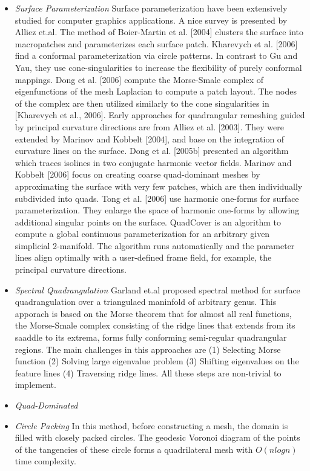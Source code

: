 \documentclass[11pt, a4paper]{paper}
\begin{document}
\begin{itemize}
\item {\em Surface Parameterization } Surface parameterization have been
extensively studied for computer graphics applications. A nice survey is
presented by Alliez et.al. \cite{alliez}
The method of Boier-Martin et al. [2004] clusters the surface into macropatches 
and parameterizes each surface patch. Kharevych et al. [2006] find a conformal
parameterization via circle patterns. In contrast to Gu and Yau, they use
cone-singularities to increase the flexibility of purely conformal mappings. 
Dong et al. [2006] compute the Morse-Smale complex of eigenfunctions of the mesh 
Laplacian to compute a patch layout. The nodes of the complex are then utilized 
similarly to the cone singularities in [Kharevych et al., 2006].  Early approaches 
for quadrangular remeshing guided by principal curvature directions are from 
Alliez et al. [2003]. They were extended by Marinov and Kobbelt [2004], and base on 
the integration of curvature lines on the surface. Dong et al. [2005b] presented an 
algorithm which traces isolines in two conjugate harmonic vector fields. Marinov and 
Kobbelt [2006] focus on creating coarse quad-dominant meshes by approximating the 
surface with very few patches, which are then individually subdivided into quads.
Tong et al. [2006] use harmonic one-forms for surface parameterization. They 
enlarge the space of harmonic one-forms by allowing additional singular points on 
the surface. 
QuadCover is an algorithm to compute a global continuous parameterization
for an arbitrary given simplicial 2-manifold. The algorithm runs 
automatically and the parameter lines align optimally with a user-defined frame field, 
for example, the principal curvature directions.


\item {\em Spectral Quadrangulation }
Garland et.al \cite{garland} proposed spectral method for surface
quadrangulation over a triangulaed maninfold of arbitrary genus. This
apporach is based on the Morse theorem that for almost all real functions,
the Morse-Smale complex consisting of the ridge lines that extends from
its saaddle to its extrema, forms fully conforming semi-regular quadrangular 
regions. The main challenges in this approaches are (1) Selecting Morse
function (2) Solving large eigenvalue problem (3) Shifting eigenvalues on the
feature lines (4) Traversing ridge lines. All these steps are non-trivial to
implement.
\item {\em Quad-Dominated }


\item {\em Circle Packing }
In this method, before constructing a mesh, the domain is filled with closely
packed circles. The geodesic Voronoi diagram of the points of the tangencies
of these circle forms a quadrilateral mesh with $O(n log n)$ time complexity.

\end {itemize}
\end{document}
